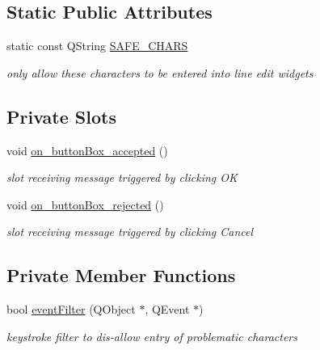 \subsection*{Static Public Attributes}
\begin{CompactItemize}
\item 
static const QString \hyperlink{classSettingsDialog_6bc9a2b185317d57fa8297f67d8a2b24}{SAFE\_\-CHARS}
\begin{CompactList}\small\item\em only allow these characters to be entered into line edit widgets \item\end{CompactList}\end{CompactItemize}
\subsection*{Private Slots}
\begin{CompactItemize}
\item 
\hypertarget{classSettingsDialog_6fdbfb0c82e95023d2484810c7e36841}{
void \hyperlink{classSettingsDialog_6fdbfb0c82e95023d2484810c7e36841}{on\_\-buttonBox\_\-accepted} ()}
\label{classSettingsDialog_6fdbfb0c82e95023d2484810c7e36841}

\begin{CompactList}\small\item\em slot receiving message triggered by clicking OK \item\end{CompactList}\item 
\hypertarget{classSettingsDialog_6b2d464f2ea14a5ef11f51bea4639093}{
void \hyperlink{classSettingsDialog_6b2d464f2ea14a5ef11f51bea4639093}{on\_\-buttonBox\_\-rejected} ()}
\label{classSettingsDialog_6b2d464f2ea14a5ef11f51bea4639093}

\begin{CompactList}\small\item\em slot receiving message triggered by clicking Cancel \item\end{CompactList}\end{CompactItemize}
\subsection*{Private Member Functions}
\begin{CompactItemize}
\item 
\hypertarget{classSettingsDialog_124b01312485fef5c9d0094f8821494f}{
bool \hyperlink{classSettingsDialog_124b01312485fef5c9d0094f8821494f}{eventFilter} (QObject $\ast$, QEvent $\ast$)}
\label{classSettingsDialog_124b01312485fef5c9d0094f8821494f}

\begin{CompactList}\small\item\em keystroke filter to dis-allow entry of problematic characters \item\end{CompactList}\end{CompactItemize}
